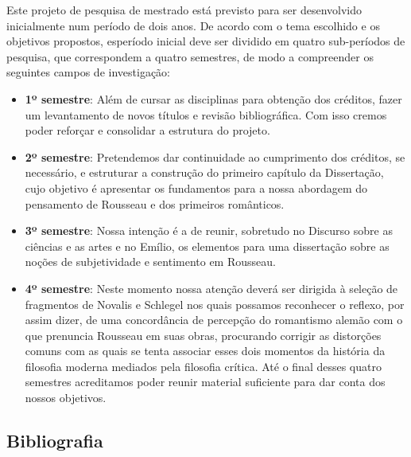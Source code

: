 \documentclass[
  paper=a4,
  twoside  ,captions=tableheading
]{scrbook}
\providecommand{\tightlist}{%
  \setlength{\itemsep}{0pt}\setlength{\parskip}{0pt}}
\begin{document}
Este projeto de pesquisa de mestrado está previsto para ser desenvolvido
inicialmente num período de dois anos. De acordo com o tema escolhido e
os objetivos propostos, esperíodo inicial deve ser dividido em quatro
sub-períodos de pesquisa, que correspondem a quatro semestres, de modo a
compreender os seguintes campos de investigação:

\begin{itemize}
\tightlist
\item
  \textbf{1º semestre}: Além de cursar as disciplinas para obtenção dos
  créditos, fazer um levantamento de novos títulos e revisão
  bibliográfica. Com isso cremos poder reforçar e consolidar a estrutura
  do projeto.
\item
  \textbf{2º semestre}: Pretendemos dar continuidade ao cumprimento dos
  créditos, se necessário, e estruturar a construção do primeiro
  capítulo da Dissertação, cujo objetivo é apresentar os fundamentos
  para a nossa abordagem do pensamento de Rousseau e dos primeiros
  românticos.
\item
  \textbf{3º semestre}: Nossa intenção é a de reunir, sobretudo no
  Discurso sobre as ciências e as artes e no Emílio, os elementos para
  uma dissertação sobre as noções de subjetividade e sentimento em
  Rousseau.
\item
  \textbf{4º semestre}: Neste momento nossa atenção deverá ser dirigida
  à seleção de fragmentos de Novalis e Schlegel nos quais possamos
  reconhecer o reflexo, por assim dizer, de uma concordância de
  percepção do romantismo alemão com o que prenuncia Rousseau em suas
  obras, procurando corrigir as distorções comuns com as quais se tenta
  associar esses dois momentos da história da filosofia moderna mediados
  pela filosofia crítica. Até o final desses quatro semestres
  acreditamos poder reunir material suficiente para dar conta dos nossos
  objetivos.
\end{itemize}

\subsection*{Bibliografia}\label{bibliografia}
\end{document}
